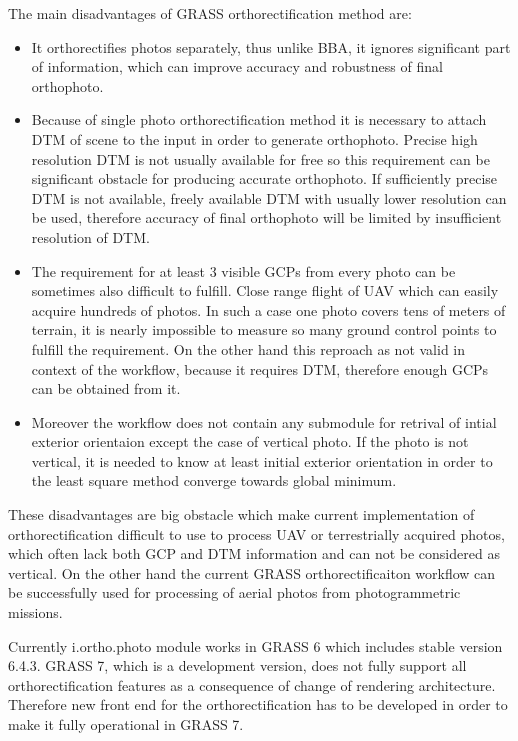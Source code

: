 \documentclass[a4paper,12pt]{article}
\begin{document}
The main disadvantages of GRASS orthorectification method are:
\begin{itemize}
\item It orthorectifies photos separately, thus unlike BBA, it ignores significant part of information,
 which can improve accuracy and robustness of final orthophoto. 
\item Because of single photo orthorectification method it is necessary to attach DTM of scene to the input 
in order to generate orthophoto. Precise high resolution DTM is not usually available for free so this 
requirement can be significant obstacle for producing accurate orthophoto. If sufficiently precise 
DTM is not available, freely available DTM with usually lower resolution can be used, therefore  
accuracy of final orthophoto will be limited by insufficient resolution of DTM.
\item The requirement for at least 3 visible GCPs from every photo can be sometimes also difficult to fulfill.
Close range flight of UAV which can easily acquire hundreds of photos.
In such a case one photo covers tens of meters
of terrain, it is nearly impossible to measure so many ground control points to fulfill the requirement. 
On the other hand this reproach as not valid in context of the workflow, because it requires DTM, therefore 
enough GCPs can be obtained from it.
\item Moreover the workflow does not contain any submodule for retrival of intial exterior orientaion except
 the case of vertical photo.   If the photo 
is not vertical, it is needed to know at least initial exterior orientation 
in order to the least square method converge towards global minimum.
\end{itemize}

These disadvantages are big obstacle which make current implementation of orthorectification difficult to use  
to process UAV or terrestrially acquired photos, which often lack both GCP and DTM information and can not be considered as vertical.
On the other hand the current GRASS orthorectificaiton workflow can be successfully used for processing
of aerial photos from photogrammetric missions.

Currently i.ortho.photo module works in GRASS 6 which includes stable version 6.4.3.
GRASS 7, which is a development version, does not fully support all orthorectification features 
as a consequence of change of rendering architecture.
Therefore new front end for the 
orthorectification has to be developed in order to make it fully operational 
in GRASS 7. 
\end{document}
